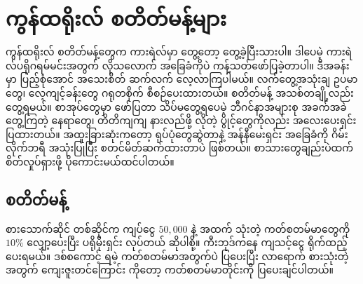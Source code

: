 \chapter{ကွန်ထရိုးလ် စတိတ်မန့်များ} \label{ch:ch07ctlstmt}

ကွန်ထရိုးလ် စတိတ်မန့်တွေက ကားရဲလ်မှာ တွေ့တော့ တွေ့ခဲ့ပြီးသားပါ။ ဒါပေမဲ့ ကားရဲလ်ပရိုဂရမ်မင်းအတွက် လိုသလောက် အခြေခံကိုပဲ ကန့်သတ်ဖော်ပြခဲ့တာပါ။ ဒီအခန်းမှာ ပြည့်စုံအောင် အသေးစိတ် ဆက်လက် လေ့လာကြပါမယ်။ လက်တွေ့အသုံးချ ဥပမာတွေ၊ လေ့ကျင့်ခန်းတွေ ဂရုတစိုက် စီစဉ်ပေးထားတယ်။ စတိတ်မန့် အသစ်တချို့လည်း တွေ့ရမယ်။ စာအုပ်တွေမှာ ဖော်ပြတာ သိပ်မတွေ့ရပေမဲ့ ဘီဂင်နာအများစု အခက်အခဲတွေ့ကြတဲ့ နေရာတွေ၊ တိတိကျကျ နားလည်ဖို့ လိုတဲ့ ပွိုင့်တွေကိုလည်း အလေးပေးရှင်းပြထားတယ်။ အထူးခြားဆုံးကတော့ ရုပ်ပုံတွေဆွဲတာနဲ့ အန်နီမေးရှင်း အခြေခံကို  ဂိမ်းလိုက်ဘရီ အသုံး\allowbreak ပြုပြီး စတင်မိတ်ဆက်ထားတာပဲ ဖြစ်တယ်။ စာသားတွေချည်းပဲထက် စိတ်လှုပ်ရှားဖို့ ပိုကောင်းမယ်ထင်ပါတယ်။

\section{ စတိတ်မန့်}
စားသောက်ဆိုင် တစ်ဆိုင်က ကျပ်ငွေ \(50,000\) နဲ့ အထက် သုံးတဲ့ ကတ်စတမ်မာတွေကို $10 \%$ လျှော့ပေးပြီး ပရိုမိုးရှင်း လုပ်တယ် ဆိုပါစို့။  ကီးဘုဒ်ကနေ ကျသင့်ငွေ ရိုက်ထည့်ပေးရမယ်။  ဒစ်စကောင့် ရမဲ့ ကတ်စတမ်မာအတွက်ပဲ  ပြပေးပြီး လာရောက် စားသုံးတဲ့အတွက် ကျေးဇူးတင်ကြောင်း  ကိုတော့ ကတ်စတမ်မာတိုင်းကို ပြပေးချင်ပါတယ်။


